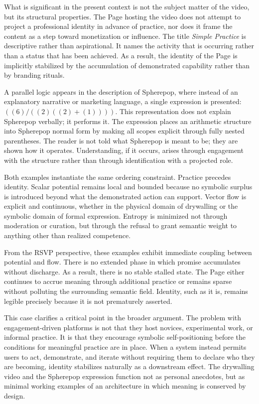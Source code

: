 \documentclass[11pt,oneside]{article}
\begin{document}
What is significant in the present context is not the subject matter of the video, but its structural properties. The Page hosting the video does not attempt to project a professional identity in advance of practice, nor does it frame the content as a step toward monetization or influence. The title \textit{Simple Practice} is descriptive rather than aspirational. It names the activity that is occurring rather than a status that has been achieved. As a result, the identity of the Page is implicitly stabilized by the accumulation of demonstrated capability rather than by branding rituals.

A parallel logic appears in the description of Spherepop, where instead of an explanatory narrative or marketing language, a single expression is presented: \(( (6) / ((2)((2) + (1))) )\). This representation does not explain Spherepop verbally; it performs it. The expression places an arithmetic structure into Spherepop normal form by making all scopes explicit through fully nested parentheses. The reader is not told what Spherepop is meant to be; they are shown how it operates. Understanding, if it occurs, arises through engagement with the structure rather than through identification with a projected role.

Both examples instantiate the same ordering constraint. Practice precedes identity. Scalar potential remains local and bounded because no symbolic surplus is introduced beyond what the demonstrated action can support. Vector flow is explicit and continuous, whether in the physical domain of drywalling or the symbolic domain of formal expression. Entropy is minimized not through moderation or curation, but through the refusal to grant semantic weight to anything other than realized competence.

From the RSVP perspective, these examples exhibit immediate coupling between potential and flow. There is no extended phase in which promise accumulates without discharge. As a result, there is no stable stalled state. The Page either continues to accrue meaning through additional practice or remains sparse without polluting the surrounding semantic field. Identity, such as it is, remains legible precisely because it is not prematurely asserted.

This case clarifies a critical point in the broader argument. The problem with engagement-driven platforms is not that they host novices, experimental work, or informal practice. It is that they encourage symbolic self-positioning before the conditions for meaningful practice are in place. When a system instead permits users to act, demonstrate, and iterate without requiring them to declare who they are becoming, identity stabilizes naturally as a downstream effect. The drywalling video and the Spherepop expression function not as personal anecdotes, but as minimal working examples of an architecture in which meaning is conserved by design.
\end{document}

